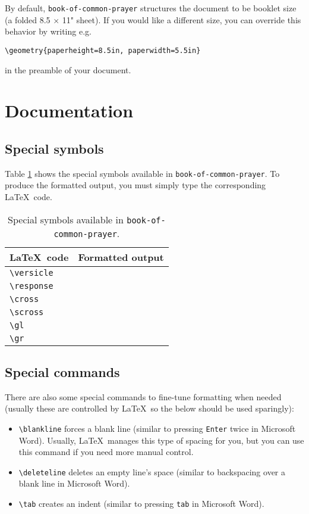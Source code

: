 \documentclass{article}
\begin{document}
By default, \texttt{book-of-common-prayer} structures the document to be booklet size (a folded 8.5 $\times$ 11" sheet). If you would like a different size, you can override this behavior by writing e.g.

\begin{lstlisting}
\geometry{paperheight=8.5in, paperwidth=5.5in}
\end{lstlisting}

in the preamble of your document.

\section{Documentation}

\subsection{Special symbols}

Table \ref{tab:symbol} shows the special symbols available in \lstinline{book-of-common-prayer}. To produce the formatted output, you must simply type the corresponding \LaTeX\ code.

\begin{table}[h!]
	\centering
	\begin{tabular}{ll}
	\toprule
	\LaTeX\ code & Formatted output \\
	\midrule
	\lstinline|\versicle| & \versicle \\
	\lstinline|\response| & \response \\
	\lstinline|\cross| & \cross \\
	\lstinline|\scross| & \sabon{\scross} \\
	\lstinline|\gl| & \gl \\
	\lstinline|\gr| & \gr \\
	\bottomrule
	\end{tabular}
	\caption{Special symbols available in \lstinline{book-of-common-prayer}.}
	\label{tab:symbol}
\end{table}

\subsection{Special commands}

There are also some special commands to fine-tune formatting when needed (usually these are controlled by \LaTeX\, so the below should be used sparingly):

\begin{itemize}
	\item \lstinline{\blankline} forces a blank line (similar to pressing \lstinline{Enter} twice in Microsoft Word). Usually, \LaTeX\ manages this type of spacing for you, but you can use this command if you need more manual control.
	\item \lstinline{\deleteline} deletes an empty line's space (similar to backspacing over a blank line in Microsoft Word).
	\item \lstinline{\tab} creates an indent (similar to pressing \lstinline{tab} in Microsoft Word).
\end{itemize}
\end{document}
